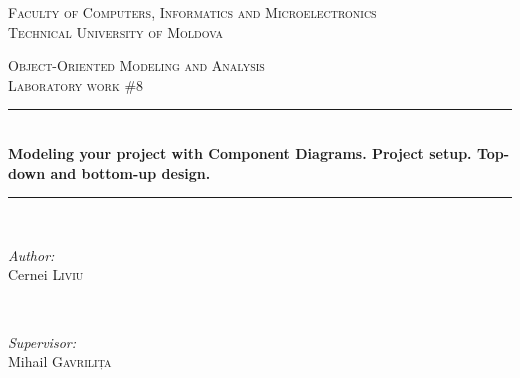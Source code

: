 \documentclass[12pt,a4paper,titlepage]{article}
\begin{document}
\begin{titlepage}

  \begin{center} %

  \textsc{\large Faculty of Computers, Informatics and Microelectronics}\\[0.5cm]
  \textsc{\large Technical University of Moldova}\\[1.2cm] %
  \vspace{25 mm}

  \textsc{\Large Object-Oriented Modeling and Analysis}\\[0.5cm] %
  \textsc{\large Laboratory work \#8}\\[0.5cm] %

\newcommand{\HRule}{\rule{\linewidth}{0.5mm}} %

  \vspace{10 mm}
  \HRule \\[0.4cm]
  { \LARGE \bfseries Modeling your project with Component Diagrams. Project setup. Top-down and bottom-up
design. }\\[0.4cm] %
  \HRule \\[1.5cm]

      \vspace{30mm}

      \begin{minipage}{0.4\textwidth}
      \begin{flushleft} \large
      \emph{Author:}\\
      Cernei \textsc{Liviu}
      \end{flushleft}
      \end{minipage}
      ~
      \begin{minipage}{0.4\textwidth}
      \begin{flushright} \large
      \emph{Supervisor:} \\
      Mihail \textsc{Gavrilița} %
      \end{flushright}
      \end{minipage}\\[4cm]


\end{center}
\end{titlepage}
\end{document}
